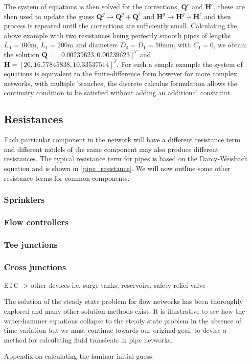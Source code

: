 The system of equations is then solved for the corrections, $\mathbf{Q}^c$ and $\mathbf{H}^c$, these are then used to update the guess $\mathbf{Q}^g \rightarrow \mathbf{Q}^g + \mathbf{Q}^c $ and $\mathbf{H}^g \rightarrow \mathbf{H}^g + \mathbf{H}^c $ and then process is repeated until the corrections are sufficiently small. Calculating the above example with two resistances being perfectly smooth pipes of lengths $L_0 = 100$m, $L_1 = 200$m and diameters $D_0=D_1=50$mm, with $C_1=0$, we obtain the solution $\mathbf{Q} = [0.00239623, 0.00239623]^T$ and $\mathbf{H} = [20, 16.77845838, 10.33537514]^T$. For such a simple example the system of equations is equivalent to the finite-difference form however for more complex networks, with multiple branches, the discrete calculus formulation allows the continuity condition to be satisfied without adding an additional constraint. 

\subsection{Resistances}

Each particular component in the network will have a different resistance term and different models of the same component may also produce different resistances. The typical resistance term for pipes is based on the Darcy-Weisbach equation and is shown in \eqref{pipe_resistance}. We will now outline some other resistance terms for common components. 







\subsubsection{Sprinklers}

\subsubsection{Flow controllers}

\subsubsection{Tee junctions}

\subsubsection{Cross junctions}

{\color{red} ETC -> other devices i.e. surge tanks, reservoirs, safety relief valve}

The solution of the steady state problem for flow networks has been thoroughly explored and many other solution methods exist. It is illustrative to see how the water-hammer equations collapse to the steady state problem in the absence of time variation but we must continue towards our original goal, to devise a method for calculating fluid transients in pipe networks. 

{\color{red} Appendix on calculating the laminar initial guess.}
